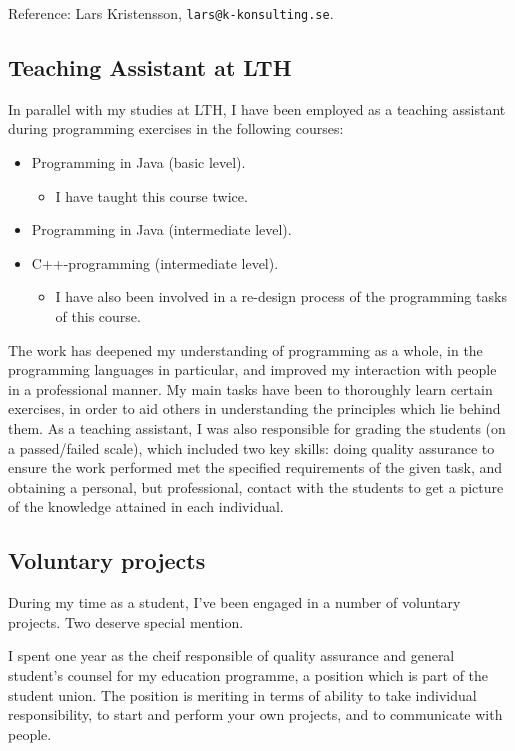 \documentclass[a4paper]{article}
\newcommand{\code}{\texttt}
\begin{document}

Reference: Lars Kristensson, \code{lars@k-konsulting.se}.

\subsection*{Teaching Assistant at LTH}
In parallel with my studies at LTH, I have been employed as a teaching assistant during programming exercises in the following courses:
\begin{itemize}
 \item Programming in Java (basic level).
 \begin{itemize}
  \item I have taught this course twice.
 \end{itemize}

 \item Programming in Java (intermediate level).
 \item C++-programming (intermediate level).
 \begin{itemize}
  \item I have also been involved in a re-design process of the programming tasks of this course.
 \end{itemize}

\end{itemize}
The work has deepened my understanding of programming as a whole, in the programming languages in particular, and improved my interaction with people in a professional manner. My main tasks have been to thoroughly learn certain exercises, in order to aid others in understanding the principles which lie behind them. As a teaching assistant, I was also responsible for grading the students (on a passed/failed scale), which included two key skills: doing quality assurance to ensure the work performed met the specified requirements of the given task, and obtaining a personal, but professional, contact with the students to get a picture of the knowledge attained in each individual.

\subsection*{Voluntary projects}
During my time as a student, I've been engaged in a number of voluntary projects. Two deserve special mention.

I spent one year as the cheif responsible of quality assurance and general student's counsel for my education programme, a position which is part of the student union. The position is meriting in terms of ability to take individual responsibility, to start and perform your own projects, and to communicate with people.
\end{document}
